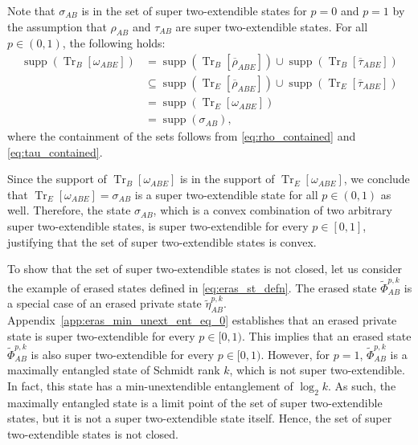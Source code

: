 \documentclass[twocolumn,letterpaper, dvipsnames,allowtoday, accepted = 2025-12-31]{quantumarticle}
\begin{document}
Note that $\sigma_{AB}$ is in the set of super two-extendible states for $p=0$ and $p=1$ by the assumption that $\rho_{AB}$ and $\tau_{AB}$ are super two-extendible states. For all $p\in (0,1)$, the following holds:
\begin{align}
    \operatorname{supp}\!\left(\operatorname{Tr}_B\!\left[\omega_{ABE}\right]\right)
    &= \operatorname{supp}\!\left(\operatorname{Tr}_B\!\left[\overline{\rho}_{ABE}\right]\right)\cup\operatorname{supp}\!\left(\operatorname{Tr}_B\!\left[\overline{\tau}_{ABE}\right]\right)\\
    &\subseteq \operatorname{supp}\!\left(\operatorname{Tr}_E\!\left[\overline{\rho}_{ABE}\right]\right)\cup\operatorname{supp}\!\left(\operatorname{Tr}_E\!\left[\overline{\tau}_{ABE}\right]\right)\\
    &= \operatorname{supp}\!\left(\operatorname{Tr}_E\!\left[\omega_{ABE}\right]\right)\\
    &= \operatorname{supp}\!\left(\sigma_{AB}\right),
    \label{eq:omega_contained}
\end{align}
where the containment of the sets follows from \eqref{eq:rho_contained} and \eqref{eq:tau_contained}. 

Since the support of $\operatorname{Tr}_B\!\left[\omega_{ABE}\right]$ is in the support of $\operatorname{Tr}_E\!\left[\omega_{ABE}\right]$, we conclude that $\operatorname{Tr}_E\!\left[\omega_{ABE}\right] = \sigma_{AB}$ is a super two-extendible state for all $p\in (0,1)$ as well. Therefore, the state $\sigma_{AB}$, which is a convex combination of two arbitrary super two-extendible states, is super two-extendible for every $p\in [0,1]$, justifying that the set of super two-extendible states is convex.

To show that the set of super two-extendible states is not closed, let us consider the example of erased states defined in \eqref{eq:eras_st_defn}. The erased state $\widetilde{\Phi}^{p,k}_{AB}$ is a special case of an erased private state $\widetilde{\eta}^{p,k}_{AB}$. Appendix~\ref{app:eras_min_unext_ent_eq_0} establishes that an erased private state is super two-extendible for every $p\in [0,1)$. This implies that an erased state $\widetilde{\Phi}^{p,k}_{AB}$ is also super two-extendible for every $p\in [0,1)$. However, for $p=1$, $\widetilde{\Phi}^{p,k}_{AB}$ is a maximally entangled state of Schmidt rank $k$, which is not super two-extendible. In fact, this state has a min-unextendible entanglement of $\log_2 k$. As such, the maximally entangled state is a limit point of the set of super two-extendible states, but it is not a super two-extendible state itself. Hence, the set of super two-extendible states is not closed.
\end{document}
